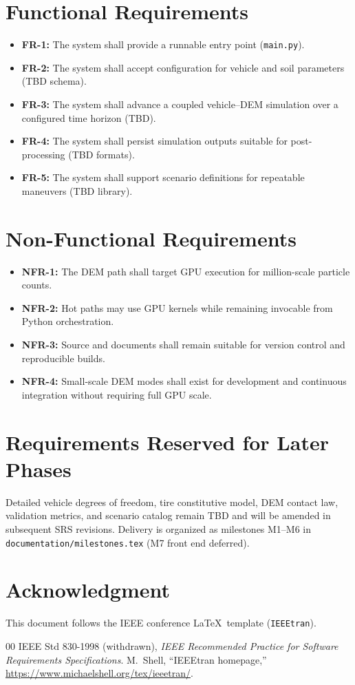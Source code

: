 \documentclass[conference]{IEEEtran}
\begin{document}
\section{Functional Requirements}
\begin{itemize}
  \item \textbf{FR-1:} The system shall provide a runnable entry point
        (\texttt{main.py}).
  \item \textbf{FR-2:} The system shall accept configuration for vehicle and
        soil parameters (TBD schema).
  \item \textbf{FR-3:} The system shall advance a coupled vehicle--DEM
        simulation over a configured time horizon (TBD).
  \item \textbf{FR-4:} The system shall persist simulation outputs suitable for
        post-processing (TBD formats).
  \item \textbf{FR-5:} The system shall support scenario definitions for
        repeatable maneuvers (TBD library).
\end{itemize}

\section{Non-Functional Requirements}
\begin{itemize}
  \item \textbf{NFR-1:} The DEM path shall target GPU execution for
        million-scale particle counts.
  \item \textbf{NFR-2:} Hot paths may use GPU kernels while remaining
        invocable from Python orchestration.
  \item \textbf{NFR-3:} Source and documents shall remain suitable for version
        control and reproducible builds.
  \item \textbf{NFR-4:} Small-scale DEM modes shall exist for development and
        continuous integration without requiring full GPU scale.
\end{itemize}

\section{Requirements Reserved for Later Phases}
Detailed vehicle degrees of freedom, tire constitutive model, DEM contact law,
validation metrics, and scenario catalog remain TBD and will be amended in
subsequent SRS revisions. Delivery is organized as milestones M1--M6 in
\texttt{documentation/milestones.tex} (M7 front end deferred).

\section*{Acknowledgment}
This document follows the IEEE conference \LaTeX\ template (\texttt{IEEEtran}).

\begin{thebibliography}{00}
 IEEE Std 830-1998 (withdrawn), \emph{IEEE Recommended Practice
for Software Requirements Specifications}.
 M.~Shell, ``IEEEtran homepage,''
\url{https://www.michaelshell.org/tex/ieeetran/}.
\end{thebibliography}
\end{document}

